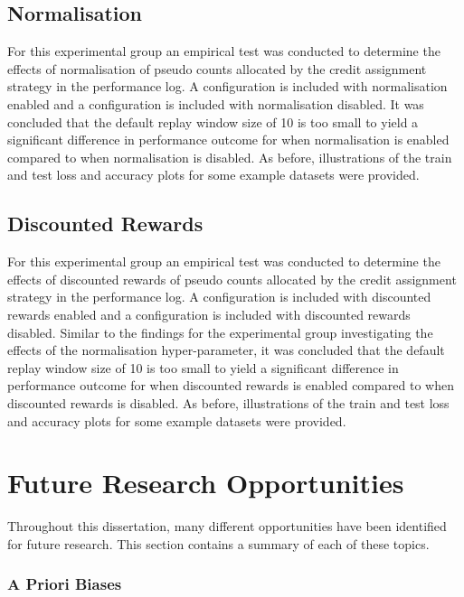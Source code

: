 \subsection{Normalisation}
\label{sec:conclusion:results:summary:normalise}

For this experimental group an empirical test was conducted to determine the effects of normalisation of pseudo counts allocated by the credit assignment strategy in the performance log. A configuration is included with normalisation enabled and a configuration is included with normalisation disabled. It was concluded that the default replay window size of 10 is too small to yield a significant difference in performance outcome for when normalisation is enabled compared to when normalisation is disabled. As before, illustrations of the train and test loss and accuracy plots for some example datasets were provided.

\subsection{Discounted Rewards}
\label{sec:conclusion:results:summary:discounted_rewards}

For this experimental group an empirical test was conducted to determine the effects of discounted rewards of pseudo counts allocated by the credit assignment strategy in the performance log. A configuration is included with discounted rewards enabled and a configuration is included with discounted rewards disabled. Similar to the findings for the experimental group investigating the effects of the normalisation hyper-parameter, it was concluded that the default replay window size of 10 is too small to yield a significant difference in performance outcome for when discounted rewards is enabled compared to when discounted rewards is disabled. As before, illustrations of the train and test loss and accuracy plots for some example datasets were provided.

\section{Future Research Opportunities}
\label{sec:conclusion:further_research}

Throughout this dissertation, many different opportunities have been identified for future research. This section contains a summary of each of these topics.

\subsubsection{A Priori Biases}
\label{sec:conclusion:further_research:a_priori_biases}

